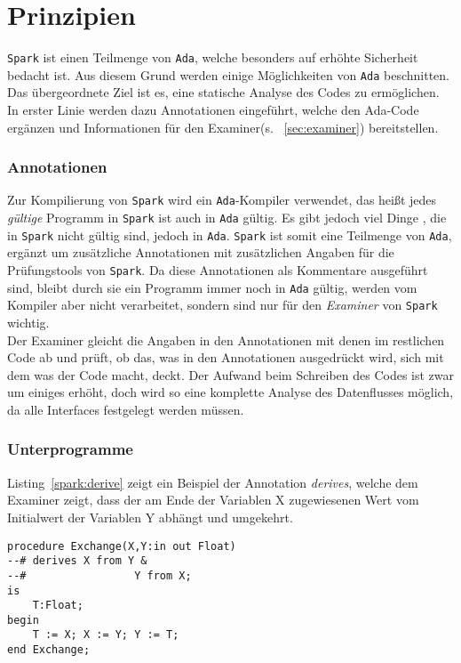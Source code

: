 \section{Prinzipien}
\label{sec:Prinzipien}
\texttt{Spark} ist einen Teilmenge von \texttt{Ada}, welche besonders auf erhöhte Sicherheit bedacht ist. Aus diesem Grund werden einige Möglichkeiten von \texttt{Ada} beschnitten. Das übergeordnete Ziel ist es, eine statische Analyse des Codes zu ermöglichen. In erster Linie werden dazu Annotationen eingeführt, welche den Ada-Code ergänzen und Informationen für den Examiner(s. ~\ref{sec:examiner}) bereitstellen.

\subsubsection{Annotationen}
\label{subsubsec:Annotationen}
Zur Kompilierung von \texttt{Spark} wird ein \texttt{Ada}-Kompiler verwendet, das heißt jedes \textit{gültige} Programm in \texttt{Spark} ist auch in \texttt{Ada} gültig. Es gibt jedoch viel Dinge , die in \texttt{Spark} nicht gültig sind, jedoch in \texttt{Ada}. \texttt{Spark} ist somit eine Teilmenge von \texttt{Ada}, ergänzt um zusätzliche Annotationen mit zusätzlichen Angaben für die Prüfungstools von \texttt{Spark}. Da diese Annotationen als Kommentare ausgeführt sind, bleibt durch sie ein Programm immer noch in \texttt{Ada} gültig, werden vom Kompiler aber nicht verarbeitet, sondern sind nur für den \textit{Examiner} von \texttt{Spark} wichtig.\\
Der Examiner gleicht die Angaben in den Annotationen mit denen im restlichen Code ab und prüft, ob das, was in den Annotationen ausgedrückt wird, sich mit dem was der Code macht, deckt. Der Aufwand beim Schreiben des Codes ist zwar um einiges erhöht, doch wird so eine komplette Analyse des Datenflusses möglich, da alle Interfaces festgelegt werden müssen.
\subsubsection{Unterprogramme}
\label{subsubsec:Unterprogramme}

Listing~\ref{spark:derive} zeigt ein Beispiel der Annotation \textit{derives}, welche dem Examiner zeigt, dass der am Ende der Variablen X zugewiesenen Wert vom Initialwert der Variablen Y abhängt und umgekehrt.
\begin{lstlisting}[caption={derive Beispiel}, label=spark:derive]
procedure Exchange(X,Y:in out Float)
--# derives X from Y &
--# 				Y from X;
is
	T:Float;
begin
	T := X; X := Y; Y := T;
end Exchange;
\end{lstlisting}

